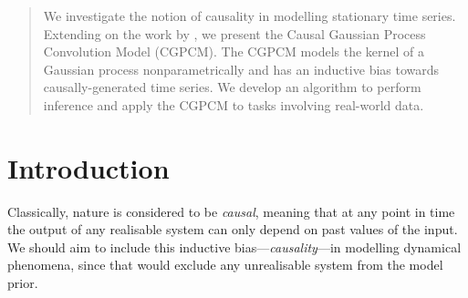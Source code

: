 \documentclass{article}
\begin{document}
\printAffiliationsAndNotice{}



\begin{abstract}
We investigate the notion of causality in modelling stationary time series. Extending on the work by \citet{Tobar:2015:Learning_Stationary}, we present the Causal Gaussian Process Convolution Model (CGPCM). The CGPCM models the kernel of a Gaussian process nonparametrically and has an inductive bias towards causally-generated time series. We develop an algorithm to perform inference and apply the CGPCM to tasks involving real-world data.
\end{abstract}

\section{Introduction}
Classically, nature is considered to be \textit{causal}, meaning that at any point in time the output of any realisable system can only depend on past values of the input. We should aim to include this inductive bias---\textit{causality}---in modelling dynamical phenomena, since that would exclude any unrealisable system from the model prior.
\end{document}
